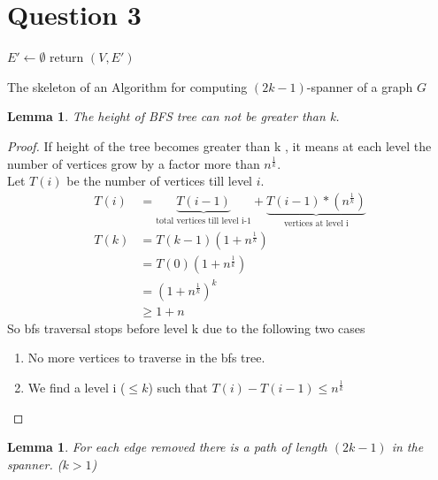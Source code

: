 \documentclass[11pt]{article}
\newtheorem{lemma}[theorem]{Lemma}
\begin{document}
\section*{Question 3}
\begin{algorithm}[h]
$E'\leftarrow \emptyset$\;
return $(V,E')$\;
\caption{The skeleton of an Algorithm for computing $(2k-1)$-spanner of a graph $G$}
\label{skeleton}
\end{algorithm}
\begin{lemma}
The height of BFS tree can not be greater than  k.
\end{lemma}
\begin{proof}
If height of the tree becomes greater than k , it means at each level the number of vertices grow by a factor more than $n^{\frac{1}{k}}$. \\ 
Let $T(i)$ be the number of vertices till level $i$.
\begin{align*}
T(i) &= \underbrace{T(i-1)}_{\text{total vertices till level i-1}} + \underbrace{T(i-1)*(n^{\frac{1}{k}})}_{\text{vertices at level i}} \\
T(k) &= T(k-1) (1 + n^{\frac{1}{k}}) \\
	&= T(0) (1 + n^{\frac{1}{k}}) \\
	&= (1 + n^{\frac{1}{k}})^{k} \\
	&\geq 1 + n 
\end{align*}
So bfs traversal stops before level k due to the following two cases
\begin{enumerate}
\item No more vertices to traverse in the bfs tree. 
\item We find a level i ($\leq k$) such that $T(i) - T(i-1) \leq n^\frac{1}{k}$ 
\end{enumerate}
\end{proof}
\begin{lemma}
For each edge removed there is a path of length $(2k-1)$ in the spanner. ($k>1$)
\end{lemma}
\end{document}
